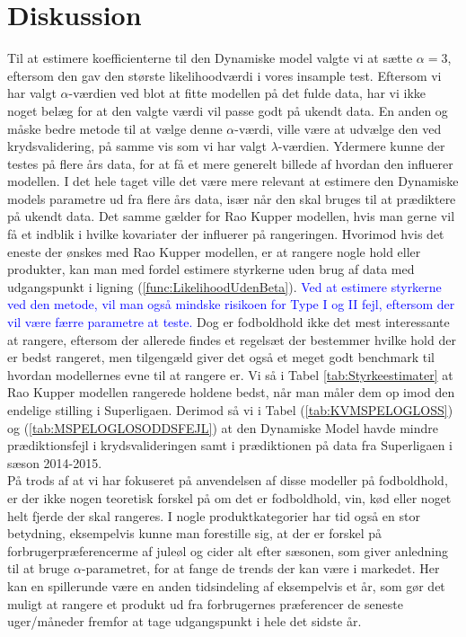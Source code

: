 \documentclass[11pt,a4paper]{article}
\begin{document}
\clearpage
\section{Diskussion}
Til at estimere koefficienterne til den Dynamiske model valgte vi at sætte $\alpha=3$, eftersom den gav den største likelihoodværdi i vores insample test. Eftersom vi har valgt $\alpha$-værdien ved blot at fitte modellen på det fulde data, har vi ikke noget belæg for at den valgte værdi vil passe godt på ukendt data. En anden og måske bedre metode til at vælge denne $\alpha$-værdi, ville være at udvælge den ved krydsvalidering, på samme vis som vi har valgt $\lambda$-værdien. Ydermere kunne der testes på flere års data, for at få et mere generelt billede af hvordan den influerer modellen. I det hele taget ville det være mere relevant at estimere den Dynamiske models parametre ud fra flere års data, især når den skal bruges til at prædiktere på ukendt data. Det samme gælder for Rao Kupper modellen, hvis man gerne vil få et indblik i hvilke kovariater der influerer på rangeringen. Hvorimod hvis det eneste der ønskes med Rao Kupper modellen, er at rangere nogle hold eller produkter, kan man med fordel estimere styrkerne uden brug af data med udgangspunkt i ligning (\ref{func:LikelihoodUdenBeta}). \textcolor{blue}{Ved at estimere styrkerne ved den metode, vil man også mindske risikoen for Type I og II fejl, eftersom der vil være færre parametre at teste.} Dog er fodboldhold ikke det mest interessante at rangere, eftersom der allerede findes et regelsæt der bestemmer hvilke hold der er bedst rangeret, men tilgengæld giver det også et meget godt benchmark til hvordan modellernes evne til at rangere er. Vi så i Tabel \ref{tab:Styrkeestimater} at Rao Kupper modellen rangerede holdene bedst, når man måler dem op imod den endelige stilling i Superligaen. Derimod så vi i Tabel (\ref{tab:KVMSPELOGLOSS}) og (\ref{tab:MSPELOGLOSODDSFEJL}) at den Dynamiske Model havde mindre prædiktionsfejl i krydsvalideringen samt i prædiktionen på data fra Superligaen i sæson 2014-2015.\\
På trods af at vi har fokuseret på anvendelsen af disse modeller på fodboldhold, er der ikke nogen teoretisk forskel på om det er fodboldhold, vin, kød eller noget helt fjerde der skal rangeres. I nogle produktkategorier har tid også en stor betydning, eksempelvis kunne man forestille sig, at der er forskel på forbrugerpræferencerme af juleøl og cider alt efter sæsonen, som giver anledning til at bruge $\alpha$-parametret, for at fange de trends der kan være i markedet. Her kan en spillerunde være en anden tidsindeling af eksempelvis et år, som gør det muligt at rangere et produkt ud fra forbrugernes præferencer de seneste uger/måneder fremfor at tage udgangspunkt i hele det sidste år. \\
\end{document}
